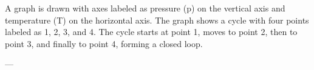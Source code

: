 A graph is drawn with axes labeled as pressure (p) on the vertical axis and temperature (T) on the horizontal axis. The graph shows a cycle with four points labeled as 1, 2, 3, and 4. The cycle starts at point 1, moves to point 2, then to point 3, and finally to point 4, forming a closed loop.

---
